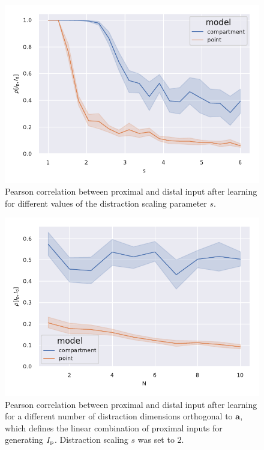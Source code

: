 \documentclass[10pt,a4paper]{article}
\begin{document}
\begin{figure}
	\includegraphics[width=\textwidth]{./figures/distraction_scaling.pdf}
	\caption{Pearson correlation between proximal and distal input after learning for different values of the distraction scaling parameter $s$.}
	\label{fig:distraction_scaling}
\end{figure}

\begin{figure}
	\includegraphics[width=\textwidth]{./figures/distraction_inputs.pdf}
	\caption{Pearson correlation between proximal and distal input after learning for a different number of distraction dimensions orthogonal to $\mathbf{a}$, which defines the linear combination of proximal inputs for generating $I_{\rm p}$. Distraction scaling $s$ was set to $2$.}
	\label{fig:distraction_inputs}
\end{figure}
\end{document}
